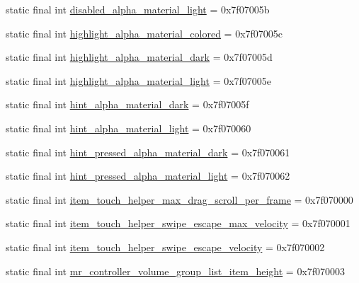 \begin{CompactItemize}
static final int \hyperlink{classandroid_1_1support_1_1transition_1_1_r_1_1dimen_d3a08798a2ca313c69833ab9e63bf3d4}{disabled\_\-alpha\_\-material\_\-light} = 0x7f07005b
\item 
static final int \hyperlink{classandroid_1_1support_1_1transition_1_1_r_1_1dimen_5eae90f22edcb3238169cfa8654adcd1}{highlight\_\-alpha\_\-material\_\-colored} = 0x7f07005c
\item 
static final int \hyperlink{classandroid_1_1support_1_1transition_1_1_r_1_1dimen_dd708438bbf8d818dd0e73d63a0fe97f}{highlight\_\-alpha\_\-material\_\-dark} = 0x7f07005d
\item 
static final int \hyperlink{classandroid_1_1support_1_1transition_1_1_r_1_1dimen_c6cca2e7fa53e7c1886e2bc860f8c53f}{highlight\_\-alpha\_\-material\_\-light} = 0x7f07005e
\item 
static final int \hyperlink{classandroid_1_1support_1_1transition_1_1_r_1_1dimen_614295d29b5e6b63ff2f17a967ebd006}{hint\_\-alpha\_\-material\_\-dark} = 0x7f07005f
\item 
static final int \hyperlink{classandroid_1_1support_1_1transition_1_1_r_1_1dimen_3bc83b447de012ffc1f1e35e6d24d3df}{hint\_\-alpha\_\-material\_\-light} = 0x7f070060
\item 
static final int \hyperlink{classandroid_1_1support_1_1transition_1_1_r_1_1dimen_0fd8db4609fb6f354274211deec942cd}{hint\_\-pressed\_\-alpha\_\-material\_\-dark} = 0x7f070061
\item 
static final int \hyperlink{classandroid_1_1support_1_1transition_1_1_r_1_1dimen_bc54df8b2be48c72cb64c2df95c45200}{hint\_\-pressed\_\-alpha\_\-material\_\-light} = 0x7f070062
\item 
static final int \hyperlink{classandroid_1_1support_1_1transition_1_1_r_1_1dimen_6b694071a00febefff382c2e3365e810}{item\_\-touch\_\-helper\_\-max\_\-drag\_\-scroll\_\-per\_\-frame} = 0x7f070000
\item 
static final int \hyperlink{classandroid_1_1support_1_1transition_1_1_r_1_1dimen_d2adc72872b90864d4d95ef95050aafe}{item\_\-touch\_\-helper\_\-swipe\_\-escape\_\-max\_\-velocity} = 0x7f070001
\item 
static final int \hyperlink{classandroid_1_1support_1_1transition_1_1_r_1_1dimen_57d3f5e66ffd8d9a7a7135f5acb99f43}{item\_\-touch\_\-helper\_\-swipe\_\-escape\_\-velocity} = 0x7f070002
\item 
static final int \hyperlink{classandroid_1_1support_1_1transition_1_1_r_1_1dimen_3ab2125ef388e4015e865bffd44a7bb8}{mr\_\-controller\_\-volume\_\-group\_\-list\_\-item\_\-height} = 0x7f070003

\end{CompactItemize}
